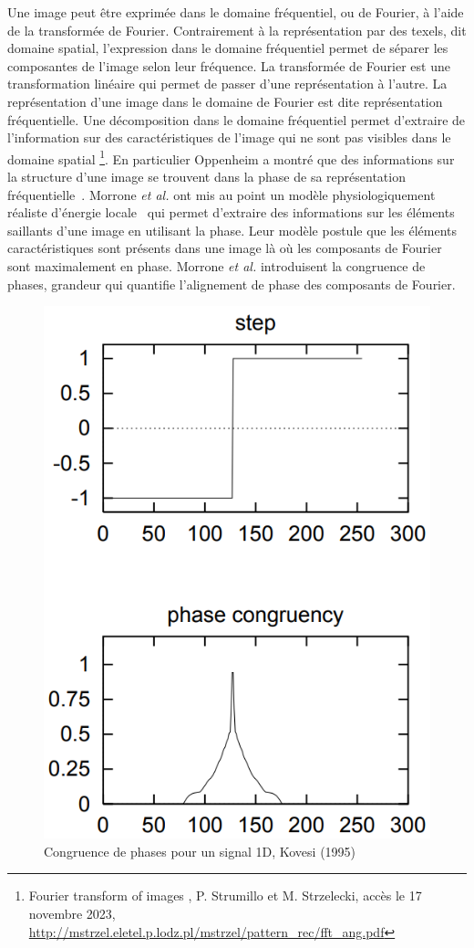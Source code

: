 Une image peut être exprimée dans le domaine fréquentiel, ou de Fourier, à l'aide de la transformée de Fourier. Contrairement à la représentation par des texels, dit domaine spatial, l'expression dans le domaine fréquentiel permet de séparer les composantes de l'image selon leur fréquence. La transformée de Fourier est une transformation linéaire qui permet de passer d'une représentation à l'autre. La représentation d'une image dans le domaine de Fourier est dite représentation fréquentielle. Une décomposition dans le domaine fréquentiel permet d'extraire de l'information sur des caractéristiques de l'image qui ne sont pas visibles dans le domaine spatial \footnote{\og Fourier transform of images \fg, P. Strumillo et M. Strzelecki, accès le 17 novembre 2023, \url{http://mstrzel.eletel.p.lodz.pl/mstrzel/pattern_rec/fft_ang.pdf}}. En particulier Oppenheim a montré que des informations sur la structure d'une image se trouvent dans la phase de sa représentation fréquentielle~\cite{oppenheim_importance_1981}. Morrone \textit{et al.} ont mis au point un modèle physiologiquement réaliste d'énergie locale~\cite{morrone_feature_1988, morrone_feature_1987} qui permet d'extraire des informations sur les éléments saillants d'une image en utilisant la phase. Leur modèle postule que les éléments caractéristiques sont présents dans une image là où les composants de Fourier sont maximalement en phase. Morrone \textit{et al.} introduisent la congruence de phases, grandeur qui quantifie l'alignement de phase des composants de Fourier.

\bigskip

\begin{figure}[t]
    \centering
    \includegraphics[width=.35\linewidth]{contenu/resources/images/pc_1d_kovesi}
    \caption[Congruence de phases pour un signal 1D]{Congruence de phases pour un signal 1D, Kovesi (1995)~\cite{kovesi_image_1995}}
    \label{fig:pc-1D-kovesi}
\end{figure}

